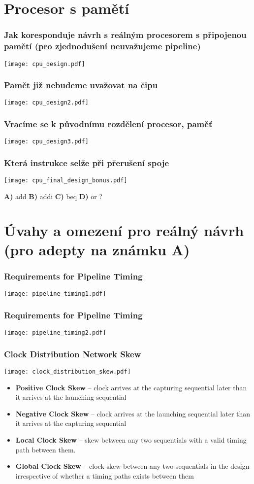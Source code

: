 \documentclass{beamer}
\begin{document}
\section{Procesor s pamětí}

\begin{frame}
\frametitle{Jak koresponduje návrh s reálným procesorem s připojenou pamětí (pro zjednodušení neuvažujeme pipeline)}
\texttt{[image: cpu\_design.pdf]}
\end{frame}

\begin{frame}
\frametitle{Pamět již nebudeme uvažovat na čipu}
\texttt{[image: cpu\_design2.pdf]}
\end{frame}

\begin{frame}
\frametitle{Vracíme se k původnímu rozdělení procesor, paměť}
\texttt{[image: cpu\_design3.pdf]}
\end{frame}

\begin{frame}
\frametitle{Která instrukce selže při přerušení spoje}
\texttt{[image: cpu\_final\_design\_bonus.pdf]}

\textbf{A)} add \hfill \textbf{B)} addi \hfill \textbf{C)} beq \hfill \textbf{ D)} or \hfill ?
\end{frame}

\section{Úvahy a omezení pro reálný návrh (pro adepty na známku A)}

\begin{frame}
\frametitle{Requirements for Pipeline Timing}
\texttt{[image: pipeline\_timing1.pdf]}
\end{frame}

\begin{frame}
\frametitle{Requirements for Pipeline Timing}
\texttt{[image: pipeline\_timing2.pdf]}
\end{frame}

\begin{frame}
\frametitle{Clock Distribution Network Skew}
\texttt{[image: clock\_distribution\_skew.pdf]}

\begin{itemize}
 \item \textbf{Positive Clock Skew} -- clock arrives at the capturing sequential later than it arrives at the launching sequential
 \item \textbf{Negative Clock Skew} -- clock arrives at the launching sequential later than it arrives at the capturing sequential
 \item \textbf{Local Clock Skew} -- skew between any two sequentials with a valid timing path between them.
 \item \textbf{Global Clock Skew} -- clock skew between any two sequentials in the design irrespective of whether a timing paths exists between them
\end{itemize}

\end{frame}
\end{document}
